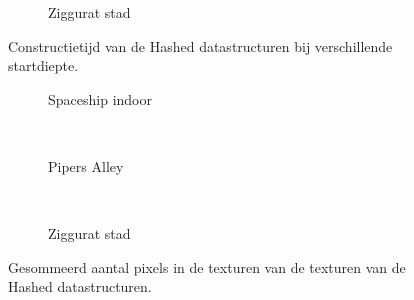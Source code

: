 \begin{figure}[t]
\begin{minipage}[t]{0.5\textwidth}
  \begin{adjustbox}{minipage=\textwidth, scale=0.55}
    \begin{subfigure}[b]{1.6\textwidth}
      \centering
      \def\svgwidth{\textwidth}
      
      \caption{Ziggurat stad}
      \label{fig:hs-sd-construction:city}
    \end{subfigure}
  \end{adjustbox}
  \caption{\small Constructietijd van de Hashed datastructuren bij verschillende startdiepte.}
  \label{fig:hs-sd-construction}
  \end{minipage}%
  \begin{minipage}[t]{0.5\textwidth}
  \begin{adjustbox}{minipage=\textwidth, scale=0.55}
    \begin{subfigure}[b]{1.6\textwidth}
      \centering
      \def\svgwidth{\textwidth}
      
      \caption{Spaceship indoor}
      \vspace{4pt}
      \label{fig:hs-sd-memory::indoor}
    \end{subfigure}
  \end{adjustbox} \\
  \begin{adjustbox}{minipage=\textwidth, scale=0.55}
    \begin{subfigure}[b]{1.6\textwidth}
      \centering
      \def\svgwidth{\textwidth}
      
      \caption{Pipers Alley}
      \vspace{4pt}
      \label{fig:hs-sd-memory:alley}
    \end{subfigure}
  \end{adjustbox} \\
  \begin{adjustbox}{minipage=\textwidth, scale=0.55}
    \begin{subfigure}[b]{1.6\textwidth}
      \centering
      \def\svgwidth{\textwidth}
      
      \caption{Ziggurat stad}
      \label{fig:hs-sd-memory:city}
    \end{subfigure}
  \end{adjustbox}
  \caption{\small Gesommeerd aantal pixels in de texturen van de texturen van de Hashed datastructuren.}
  \label{fig:hs-sd-memory}
  \end{minipage} 
\end{figure}

